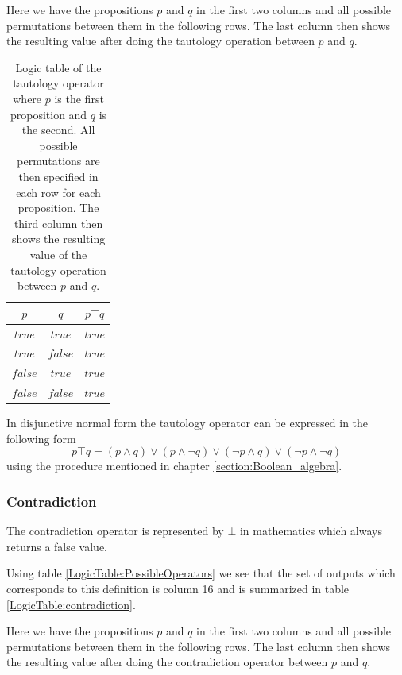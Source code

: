         Here we have the propositions $p$ and $q$ in the first two columns and all possible permutations between them in the following rows. The last column then shows the resulting value after doing the tautology operation between $p$ and $q$.
        
        \begin{table}[h!]
            \centering
            \begin{tabular}{|c|c|c|}
            	\hline
            	  $p$   &   $q$   & $p \top q$ \\ \hline
            	$true$  & $true$  &   $true$   \\ \hline
            	$true$  & $false$ &   $true$   \\ \hline
            	$false$ & $true$  &   $true$   \\ \hline
            	$false$ & $false$ &   $true$   \\ \hline
            \end{tabular}
            \caption{Logic table of the tautology operator where $p$ is the first proposition and $q$ is the second. All possible permutations are then specified in each row for each proposition. The third column then shows the resulting value of the tautology operation between $p$ and $q$.}
            \label{LogicTable:tautology}
        \end{table}
        
        In disjunctive normal form the tautology operator can be expressed in the following form
        \begin{equation}
            p \top q = (p \wedge q) \vee (p \wedge \neg q) \vee (\neg p \wedge q) \vee (\neg p \wedge \neg q)
        \end{equation}
        using the procedure mentioned in chapter \ref{section:Boolean_algebra}.
    
    \subsubsection{Contradiction}
        The contradiction operator is represented by $\bot$ in mathematics which always returns a false value.
        
        Using table \ref{LogicTable:PossibleOperators} we see that the set of outputs which corresponds to this definition is column 16 and is summarized in table \ref{LogicTable:contradiction}.
        
        Here we have the propositions $p$ and $q$ in the first two columns and all possible permutations between them in the following rows. The last column then shows the resulting value after doing the contradiction operator between $p$ and $q$.
        
